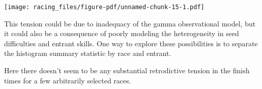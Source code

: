 \documentclass[
  letterpaper,
  DIV=11,
  numbers=noendperiod]{scrartcl}
\newenvironment{Shaded}{\begin{snugshade}}{\end{snugshade}}
\newcommand{\AttributeTok}[1]{\textcolor[rgb]{0.40,0.45,0.13}{#1}}
\newcommand{\DecValTok}[1]{\textcolor[rgb]{0.68,0.00,0.00}{#1}}
\newcommand{\FunctionTok}[1]{\textcolor[rgb]{0.28,0.35,0.67}{#1}}
\newcommand{\NormalTok}[1]{\textcolor[rgb]{0.00,0.23,0.31}{#1}}
\newcommand{\SpecialCharTok}[1]{\textcolor[rgb]{0.37,0.37,0.37}{#1}}
\newcommand{\StringTok}[1]{\textcolor[rgb]{0.13,0.47,0.30}{#1}}
\begin{document}
\begin{Shaded}
\end{Shaded}

\texttt{[image: racing\_files/figure-pdf/unnamed-chunk-15-1.pdf]}

This tension could be due to inadequacy of the gamma observational
model, but it could also be a consequence of poorly modeling the
heterogeneity in seed difficulties and entrant skills. One way to
explore these possibilities is to separate the histogram summary
statistic by race and entrant.

Here there doesn't seem to be any substantial retrodictive tension in
the finish times for a few arbitrarily selected races.
\end{document}
